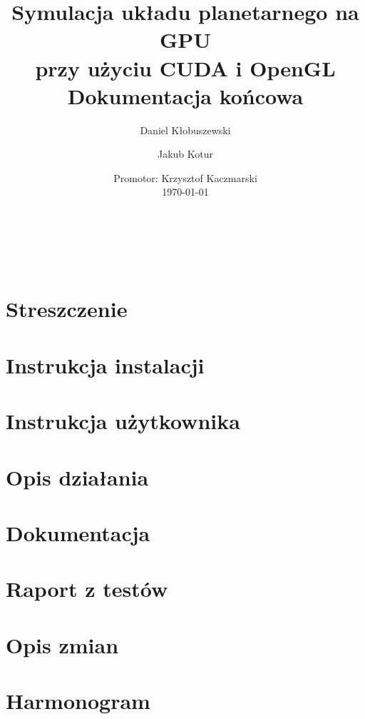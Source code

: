 \documentclass[a4paper,titlepage,10pt]{article}
\title{\huge Symulacja układu planetarnego na GPU\\ przy użyciu CUDA i OpenGL\\\small Dokumentacja końcowa}
\author{Daniel Kłobuszewski\and Jakub Kotur}
\date{Promotor: Krzysztof Kaczmarski\\\vspace{24pt}\today}
\begin{document}
	\maketitle
	
	\pagestyle{fancyplain}
	\cfoot{\thepage/\pageref{LastPage}}

	\hfill \\ 
	\hfill \\ 

	\newpage

	\tableofcontents

	\newpage

	\section{Streszczenie}\label{sec:streszczenie}
	
	\newpage
	\section{Instrukcja instalacji}\label{sec:instrukcja użytkownika}
	
	\section{Instrukcja użytkownika}\label{sec:instrukcja użytkownika}
	
	\section{Opis działania}\label{sec:opis dzialania}
	
	\section{Dokumentacja}\label{sec:dokumentacja}
	
	\section{Raport z testów}\label{sec:raport z testów}
	
	\section{Opis zmian}\label{sec:opis zmian}
	
	\section{Harmonogram}\label{sec:harmonogram}
	
\end{document}
